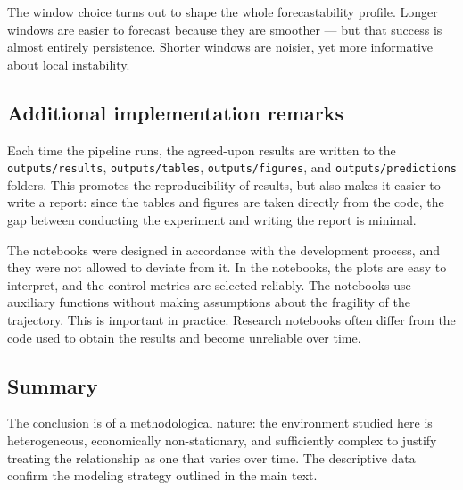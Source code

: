The window choice turns out to shape the whole forecastability profile. Longer windows are easier to forecast because they are smoother --- but that success is almost entirely persistence. Shorter windows are noisier, yet more informative about local instability.

\subsection{Additional implementation remarks}

Each time the pipeline runs, the agreed-upon results are written to the \texttt{outputs/results}, \texttt{outputs/tables}, \texttt{outputs/figures}, and \texttt{outputs/predictions} folders. This promotes the reproducibility of results, but also makes it easier to write a report: since the tables and figures are taken directly from the code, the gap between conducting the experiment and writing the report is minimal.

The notebooks were designed in accordance with the development process, and they were not allowed to deviate from it. In the notebooks, the plots are easy to interpret, and the control metrics are selected reliably. The notebooks use auxiliary functions without making assumptions about the fragility of the trajectory. This is important in practice. Research notebooks often differ from the code used to obtain the results and become unreliable over time.

\subsection{Summary}

The conclusion is of a methodological nature: the environment studied here is heterogeneous, economically non-stationary, and sufficiently complex to justify treating the relationship as one that varies over time. The descriptive data confirm the modeling strategy outlined in the main text.
